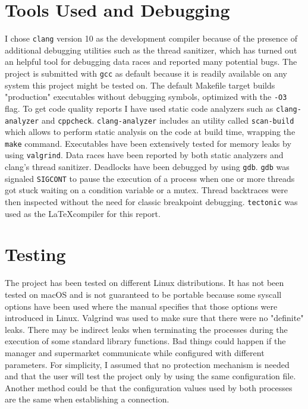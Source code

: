 \documentclass{article}
\begin{document}
    

    \section{Tools Used and Debugging} I chose \texttt{clang} version 10
    as the development compiler because of the presence
    of additional debugging utilities such as the thread sanitizer, which
    has turned out an helpful tool for debugging data races and reported
    many potential bugs. The project is submitted with \texttt{gcc} as default
    because it is readily available on any system this project might be tested
    on. The default Makefile target builds "production"
    executables without debugging symbols, optimized with the \texttt{-O3}
    flag.  To get code quality reports I have used static code analyzers such
    as \texttt{clang-analyzer} and \texttt{cppcheck}. \texttt{clang-analyzer}
    includes an utility called \texttt{scan-build} which allows to perform
    static analysis on the code at build time, wrapping the \texttt{make}
    command. Executables have been extensively tested for memory leaks by
    using \texttt{valgrind}.  Data races have been reported by both static
    analyzers and clang's thread sanitizer. Deadlocks have been debugged by
    using \texttt{gdb}. \texttt{gdb} was signaled \texttt{SIGCONT} to pause
    the execution of a process when one or more threads got stuck waiting on
    a condition variable or a mutex. Thread backtraces were then inspected
    without the need for classic breakpoint debugging. \texttt{tectonic}
    was used as the \LaTeX\@ compiler for this report.

    \section{Testing} The project has been tested on different Linux
    distributions. It has not been tested on macOS and is not guaranteed
    to be portable because some syscall options have been used where the
    manual specifies that those options were introduced in Linux. Valgrind
    was used to make sure that there were no "definite" leaks. There may be
    indirect leaks when terminating the processes during the execution of
    some standard library functions.
    Bad things could happen if the manager and supermarket communicate
    while configured with different parameters. For simplicity, I assumed that no protection
    mechanism is needed and that the user will test the project only by using
    the same configuration file. Another method could be that the configuration
    values used by both processes are the same when establishing a connection.
\end{document}
